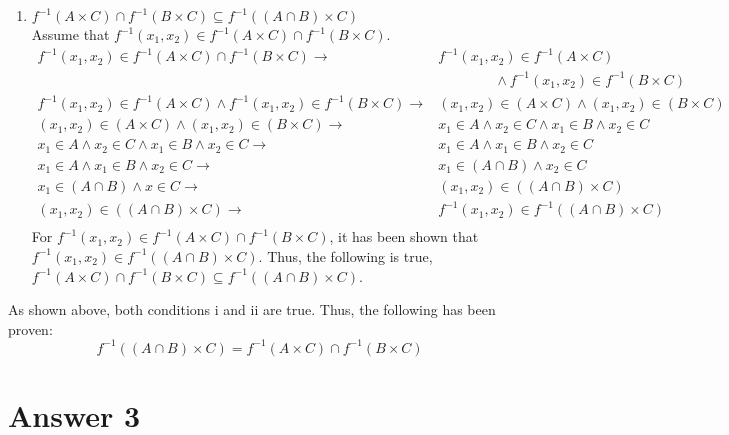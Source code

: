 \documentclass[12pt]{article}
\begin{document}
\begin{enumerate}
    \item{$f^{-1}(A \times C) \cap f^{-1}(B \times C) \subseteq f^{-1}((A \cap B) \times C)$ \\ Assume that $f^{-1}(x_1, x_2) \in f^{-1}(A \times C) \cap f^{-1}(B \times C)$.
    \begin{equation*}
    \begin{split}
        f^{-1}(x_1, x_2) \in f^{-1}(A \times C) \cap f^{-1}(B \times C) \rightarrow & f^{-1}(x_1, x_2) \in f^{-1}(A \times C) \\ & \qquad \qquad \land f^{-1}(x_1, x_2) \in f^{-1}(B \times C)\\
        f^{-1}(x_1, x_2) \in f^{-1}(A \times C) \land f^{-1}(x_1, x_2) \in f^{-1}(B \times C) \rightarrow & (x_1, x_2) \in (A \times C) \land (x_1, x_2) \in (B \times C)\\
        (x_1, x_2) \in (A \times C) \land (x_1, x_2) \in (B \times C) \rightarrow & x_1 \in A \land x_2 \in C \land x_1 \in B \land x_2 \in C\\
        x_1 \in A \land x_2 \in C \land x_1 \in B \land x_2 \in C \rightarrow & x_1 \in A \land x_1 \in B \land x_2 \in C\\
        x_1 \in A \land x_1 \in B \land x_2 \in C \rightarrow & x_1 \in (A \cap B) \land x_2 \in C\\
        x_1 \in (A \cap B) \land x \in C \rightarrow & (x_1, x_2) \in ((A \cap B) \times C)\\
        (x_1, x_2) \in ((A \cap B) \times C) \rightarrow & f^{-1}(x_1, x_2) \in f^{-1}((A \cap B) \times C)\\
    \end{split}
    \end{equation*}}
    For $f^{-1}(x_1, x_2) \in f^{-1}(A \times C) \cap f^{-1}(B \times C)$, it has been shown that $f^{-1}(x_1, x_2) \in f^{-1}((A \cap B) \times C)$. Thus, the following is true, $f^{-1}(A \times C) \cap f^{-1}(B \times C) \subseteq f^{-1}((A \cap B) \times C)$.
\end{enumerate}

\noindent
As shown above, both conditions i and ii are true. Thus, the following has been proven:
\begin{equation*}
    f^{-1}((A \cap B) \times C) = f^{-1}(A \times C) \cap f^{-1}(B \times C)    
\end{equation*}





\section*{Answer 3}
\end{document}
